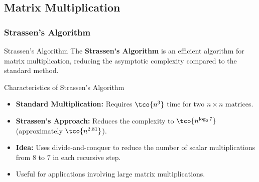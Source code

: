 \newpage
\subsection{Matrix Multiplication}
\subsubsection{Strassen's Algorithm}
\begin{definition}[]{Strassen’s Algorithm}
    The \textbf{Strassen’s Algorithm} is an efficient algorithm for matrix multiplication, reducing the asymptotic complexity compared to the standard method.
\end{definition}

\begin{properties}[]{Characteristics of Strassen’s Algorithm}
    \begin{itemize}
        \item \textbf{Standard Multiplication:} Requires $\tco{n^3}$ time for two $n \times n$ matrices.
        \item \textbf{Strassen’s Approach:} Reduces the complexity to $\tco{n^{\log_2 7}}$ (approximately $\tco{n^{2.81}}$).
        \item \textbf{Idea:} Uses divide-and-conquer to reduce the number of scalar multiplications from $8$ to $7$ in each recursive step.
        \item Useful for applications involving large matrix multiplications.
    \end{itemize}
\end{properties}

